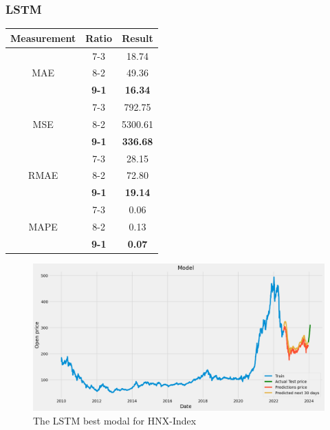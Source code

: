 \documentclass{ieeeojies}
\begin{document}
\subsubsection{LSTM}
\begin{table}[H]
    \centering
    \begin{tabular}{|c|c|c|}
        \hline
         Measurement & Ratio &  Result  \\
        \hline
             & 7-3 & 18.74  \\
        MAE  & 8-2 & 49.36  \\
            & \textbf{9-1} & \textbf{16.34}  \\
        \hline
           & 7-3 & 792.75  \\
        MSE  & 8-2 & 5300.61  \\
            & \textbf{9-1} & \textbf{336.68}  \\
        \hline
           & 7-3 & 28.15  \\
        RMAE  & 8-2 & 72.80  \\
            & \textbf{9-1} &\textbf{ 19.14}  \\
        \hline
           & 7-3 & 0.06  \\
        MAPE  & 8-2 & 0.13  \\
            & \textbf{9-1 }& \textbf{0.07}  \\
        \hline
    \end{tabular}
    \label{table:example}
\end{table}
\begin{figure}[H]
    \centering
    \includegraphics[width=0.8\linewidth]{LSTM-HNX-91.png}
    \caption{The LSTM best modal for HNX-Index}
    \label{fig:example}
\end{figure}
\end{document}

